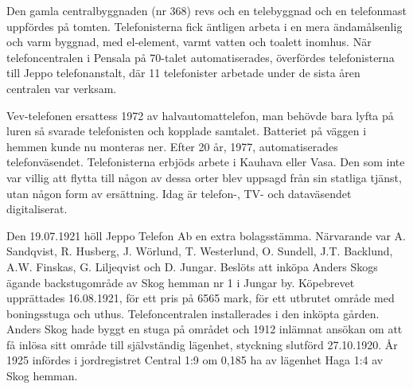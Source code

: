 Den gamla centralbyggnaden (nr 368) revs och en telebyggnad och en telefonmast uppfördes på tomten. Telefonisterna fick äntligen arbeta i en mera ändamålsenlig och varm byggnad, med el-element, varmt vatten och toalett inomhus. När telefoncentralen i Pensala på 70-talet automatiserades, överfördes telefonisterna till Jeppo telefonanstalt, där 11 telefonister arbetade under de sista åren centralen var verksam.

Vev-telefonen ersattess 1972 av halvautomattelefon, man behövde bara lyfta på luren så svarade telefonisten och kopplade samtalet. Batteriet på väggen i hemmen kunde nu monteras ner. Efter 20 år, 1977, automatiserades telefonväsendet. Telefonisterna erbjöds arbete i Kauhava eller Vasa. Den som inte var villig att flytta till någon av dessa orter blev uppsagd från sin statliga tjänst, utan någon form av ersättning. Idag är telefon-, TV- och dataväsendet digitaliserat.



%
Den 19.07.1921 höll Jeppo Telefon Ab en extra bolagsstämma.	Närvarande var A. Sandqvist, R. Husberg, J. Wörlund, T. Westerlund,	O. Sundell, J.T. Backlund, A.W. Finskas, G. Liljeqvist och D. Jungar.	Beslöts att inköpa Anders Skogs ägande backstugområde av Skog hemman nr 1 i Jungar by. Köpebrevet upprättades 16.08.1921, för ett	pris på 6565 mark, för ett utbrutet område med boningsstuga och uthus. Telefoncentralen installerades i den inköpta gården. Anders Skog hade byggt en stuga på området och 1912 inlämnat ansökan om att få inlösa sitt område till självständig lägenhet, styckning slutförd 27.10.1920. År 1925 infördes i jordregistret Central 1:9 om 0,185 ha av lägenhet Haga 1:4 av Skog hemman.

